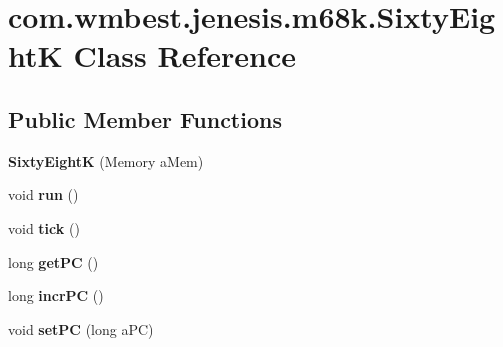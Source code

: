 \hypertarget{classcom_1_1wmbest_1_1jenesis_1_1m68k_1_1SixtyEightK}{\section{com.\-wmbest.\-jenesis.\-m68k.\-Sixty\-Eight\-K Class Reference}
\label{classcom_1_1wmbest_1_1jenesis_1_1m68k_1_1SixtyEightK}
}
\subsection*{Public Member Functions}
\begin{DoxyCompactItemize}
\item 
\hypertarget{classcom_1_1wmbest_1_1jenesis_1_1m68k_1_1SixtyEightK_add05e45fa7dc652958fac67a0a3604e7}{{\bfseries Sixty\-Eight\-K} (Memory a\-Mem)}\label{classcom_1_1wmbest_1_1jenesis_1_1m68k_1_1SixtyEightK_add05e45fa7dc652958fac67a0a3604e7}

\item 
\hypertarget{classcom_1_1wmbest_1_1jenesis_1_1m68k_1_1SixtyEightK_abe829ff42d3f776f7decdcad57f27360}{void {\bfseries run} ()}\label{classcom_1_1wmbest_1_1jenesis_1_1m68k_1_1SixtyEightK_abe829ff42d3f776f7decdcad57f27360}

\item 
\hypertarget{classcom_1_1wmbest_1_1jenesis_1_1m68k_1_1SixtyEightK_a4246faf1c578e6296966b3f54df9ca78}{void {\bfseries tick} ()}\label{classcom_1_1wmbest_1_1jenesis_1_1m68k_1_1SixtyEightK_a4246faf1c578e6296966b3f54df9ca78}

\item 
\hypertarget{classcom_1_1wmbest_1_1jenesis_1_1m68k_1_1SixtyEightK_a1ab0c1e96f4e59c799526611bddbabb3}{long {\bfseries get\-P\-C} ()}\label{classcom_1_1wmbest_1_1jenesis_1_1m68k_1_1SixtyEightK_a1ab0c1e96f4e59c799526611bddbabb3}

\item 
\hypertarget{classcom_1_1wmbest_1_1jenesis_1_1m68k_1_1SixtyEightK_a19627bfd505b0af5085c90c6ce1a8263}{long {\bfseries incr\-P\-C} ()}\label{classcom_1_1wmbest_1_1jenesis_1_1m68k_1_1SixtyEightK_a19627bfd505b0af5085c90c6ce1a8263}

\item 
\hypertarget{classcom_1_1wmbest_1_1jenesis_1_1m68k_1_1SixtyEightK_a819bf47bf9c23e41f8c83f248e37e3ae}{void {\bfseries set\-P\-C} (long a\-P\-C)}\label{classcom_1_1wmbest_1_1jenesis_1_1m68k_1_1SixtyEightK_a819bf47bf9c23e41f8c83f248e37e3ae}


\end{DoxyCompactItemize}
